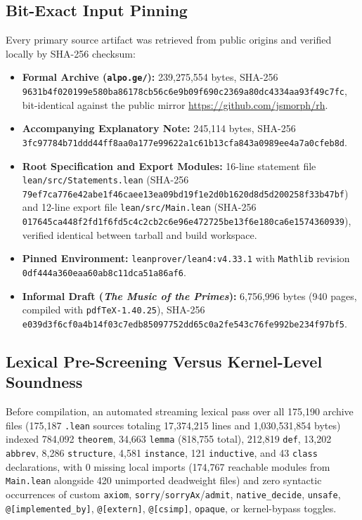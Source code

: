 \documentclass[11pt,a4paper]{article}
\newcommand{\code}[1]{\texttt{\small #1}}
\begin{document}
\subsection{Bit-Exact Input Pinning}

Every primary source artifact was retrieved from public origins and verified locally by SHA-256 checksum:
\begin{itemize}
  \item \textbf{Formal Archive (\texttt{alpo.ge/}):} 239,275,554 bytes, SHA-256 \code{9631b4f020199e58\allowbreak 0ba86178cb56c6e9\allowbreak b09f690c2369a80d\allowbreak c4334aa93f49c7fc}, bit-identical against the public mirror \url{https://github.com/jsmorph/rh}.
  \item \textbf{Accompanying Explanatory Note:} 245,114 bytes, SHA-256 \code{3fc97784b71ddd44\allowbreak ff8aa0a177e99622\allowbreak a1c61b13cfa843a0\allowbreak 989ee4a7a0cfeb8d}.
  \item \textbf{Root Specification and Export Modules:} 16-line statement file \texttt{lean/src/Statements.lean} (SHA-256 \code{79ef7ca776e42abe\allowbreak 1f46caee13ea09bd\allowbreak 19f1e2d0b1620d8d\allowbreak 5d200258f33b47bf}) and 12-line export file \texttt{lean/src/Main.lean} (SHA-256 \code{017645ca448f2fd1\allowbreak f6fd5c4c2cb2c6e9\allowbreak 6e472725be13f6e1\allowbreak 80ca6e1574360939}), verified identical between tarball and build workspace.
  \item \textbf{Pinned Environment:} \texttt{leanprover/lean4:v4.33.1} with \texttt{Mathlib} revision \code{0df444a360eaa60a\allowbreak b8c11dca51a86af6\allowbreak 92955474}.
  \item \textbf{Informal Draft (\emph{The Music of the Primes}):} 6,756,996 bytes (940 pages, compiled with \texttt{pdfTeX-1.40.25}), SHA-256 \code{e039d3f6cf0a4b14\allowbreak f03c7edb85097752\allowbreak dd65c0a2fe543c76\allowbreak fe992be234f97bf5}.
\end{itemize}

\subsection{Lexical Pre-Screening Versus Kernel-Level Soundness}

Before compilation, an automated streaming lexical pass over all 175,190 archive files (175,187 \texttt{.lean} sources totaling 17,374,215 lines and 1,030,531,854 bytes) indexed 784,092 \texttt{theorem}, 34,663 \texttt{lemma} (818,755 total), 212,819 \texttt{def}, 13,202 \texttt{abbrev}, 8,286 \texttt{structure}, 4,581 \texttt{instance}, 121 \texttt{inductive}, and 43 \texttt{class} declarations, with 0 missing local imports (174,767 reachable modules from \texttt{Main.lean} alongside 420 unimported deadweight files) and zero syntactic occurrences of custom \texttt{axiom}, \texttt{sorry}/\texttt{sorryAx}/\texttt{admit}, \texttt{native\_decide}, \texttt{unsafe}, \texttt{@[implemented\_by]}, \texttt{@[extern]}, \texttt{@[csimp]}, \texttt{opaque}, or kernel-bypass toggles.
\end{document}
